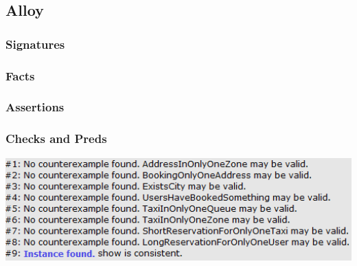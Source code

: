 \newpage
\subsection{Alloy}
	\subsubsection{Signatures}
		
\newpage
	\subsubsection{Facts}
		
	\subsubsection{Assertions}
		
\newpage
	\subsubsection{Checks and Preds}
	\begin{center}
		
		\includegraphics[width=1\textwidth]{./images/alloy_results}
	\end{center}
